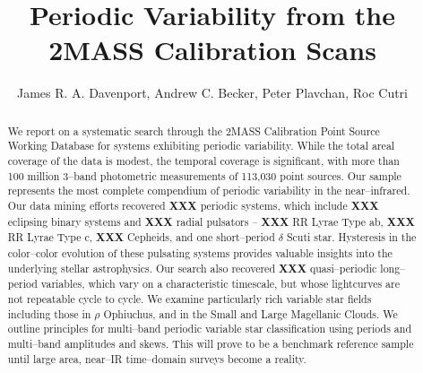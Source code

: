 \documentclass[]{emulateapj}
\begin{document}
 
\title{Periodic Variability from the 2MASS Calibration Scans}


\author{James R. A. Davenport,
Andrew C. Becker,
Peter Plavchan,
Roc Cutri}

 



\begin{abstract}

We report on a systematic search through the 2MASS Calibration Point
Source Working Database for systems exhibiting periodic variability.
While the total areal coverage of the data is modest, the temporal
coverage is significant, with more than 100 million 3--band
photometric measurements of 113,030 point sources.  Our sample
represents the most complete compendium of periodic variability in the
near--infrared.  Our data mining efforts recovered {\bf XXX} periodic
systems, which include {\bf XXX} eclipsing binary systems and {\bf
  XXX} radial pulsators -- {\bf XXX} RR Lyrae Type ab, {\bf XXX} RR
Lyrae Type c, {\bf XXX} Cepheids, and one short--period $\delta$ Scuti
star.  Hysteresis in the color--color evolution of these pulsating
systems provides valuable insights into the underlying stellar
astrophysics.  Our search also recovered {\bf XXX} quasi--periodic
long--period variables, which vary on a characteristic timescale, but
whose lightcurves are not repeatable cycle to cycle.  We examine
particularly rich variable star fields including those in $\rho$
Ophiuchus, and in the Small and Large Magellanic Clouds.  We outline
principles for multi--band periodic variable star classification using
periods and multi--band amplitudes and skews.  This will prove to be a
benchmark reference sample until large area, near--IR time--domain
surveys become a reality.

\end{abstract}
\end{document}
